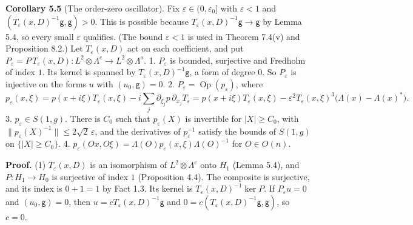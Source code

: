 \documentclass[
  11pt,
]{article}
\begin{document}
\textbf{Corollary 5.5} (The order-zero oscillator). Fix
\(\varepsilon\in(0,\varepsilon_0]\) with \(\varepsilon<1\) and
\((T_\varepsilon(x,D)^{-1}\mathsf g,\mathsf g)>0\). This is possible
because \(T_\varepsilon(x,D)^{-1}\mathsf g\to\mathsf g\) by Lemma 5.4,
so every small \(\varepsilon\) qualifies. (The bound \(\varepsilon<1\)
is used in Theorem 7.4(v) and Proposition 8.2.) Let
\(T_\varepsilon(x,D)\) act on each coefficient, and put
\(P_\varepsilon=P\,T_\varepsilon(x,D):L^2\otimes\Lambda^e\to L^2\otimes\Lambda^o\).
1. \(P_\varepsilon\) is bounded, surjective and Fredholm of index \(1\).
Its kernel is spanned by \(T_\varepsilon(x,D)^{-1}\mathsf g\), a form of
degree \(0\). So \(P_\varepsilon\) is injective on the forms \(u\) with
\((u_0,\mathsf g)=0\). 2.
\(P_\varepsilon=\operatorname{Op}(p_\varepsilon)\), where \[
p_\varepsilon(x,\xi)=p(x+i\xi)T_\varepsilon(x,\xi)-i\sum_j\partial_{\xi_j}p\,\partial_{x_j}T_\varepsilon
=p(x+i\xi)T_\varepsilon(x,\xi)-\varepsilon^2T_\varepsilon(x,\xi)^3\bigl(\Lambda(x)-\Lambda(x)^*\bigr).
\tag{5.3}
\] 3. \(p_\varepsilon\in S(1,g)\). There is \(C_0\) such that
\(p_\varepsilon(X)\) is invertible for \(|X|\ge C_0\), with
\(\|p_\varepsilon(X)^{-1}\|\le2\sqrt2\,\varepsilon\), and the
derivatives of \(p_\varepsilon^{-1}\) satisfy the bounds of \(S(1,g)\)
on \(\{|X|\ge C_0\}\). 4.
\(p_\varepsilon(Ox,O\xi)=\Lambda(O)p_\varepsilon(x,\xi)\Lambda(O)^{-1}\)
for \(O\in O(n)\).

\textbf{Proof.} (1) \(T_\varepsilon(x,D)\) is an isomorphism of
\(L^2\otimes\Lambda^e\) onto \(H_1\) (Lemma 5.4), and \(P:H_1\to H_0\)
is surjective of index \(1\) (Proposition 4.4). The composite is
surjective, and its index is \(0+1=1\) by Fact 1.3. Its kernel is
\(T_\varepsilon(x,D)^{-1}\ker P\). If \(P_\varepsilon u=0\) and
\((u_0,\mathsf g)=0\), then \(u=cT_\varepsilon(x,D)^{-1}\mathsf g\) and
\(0=c(T_\varepsilon(x,D)^{-1}\mathsf g,\mathsf g)\), so \(c=0\).
\end{document}
